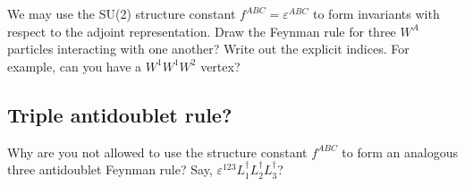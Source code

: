 \documentclass[12pt]{article}
\numberwithin{equation}{section}    %
\begin{document}
We may use the SU(2) structure constant $f^{ABC} = \varepsilon^{ABC}$ to form invariants with respect to the adjoint representation. Draw the Feynman rule for three $W^A$ particles interacting with one another? Write out the explicit indices. For example, can you have a $W^1W^1W^2$ vertex?

\subsection{Triple antidoublet rule?}

Why are you not allowed to use the structure constant $f^{ABC}$ to form an analogous three antidoublet Feynman rule? Say, $\varepsilon^{123}L^\dag_1L^\dag_2L^\dag_3$?



\end{document}
